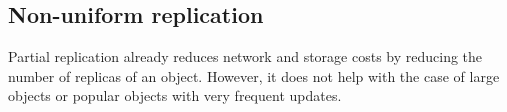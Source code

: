 

\subsection{Non-uniform replication}
\label{subsec:nonuniform}

Partial replication already reduces network and storage costs by reducing the number of replicas of an object.
However, it does not help with the case of large objects or popular objects with very frequent updates.

